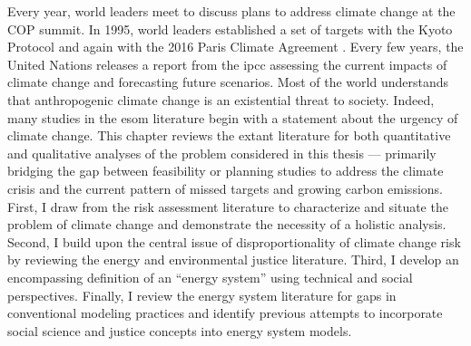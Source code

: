 Every year, world leaders meet to discuss plans to address climate change at the
COP summit. In 1995, world leaders established a set of targets with the Kyoto
Protocol \cite{united_nations_kyoto_1998} and again with the 2016 Paris Climate
Agreement \cite{united_nations_paris_2015}. Every few years, the United Nations
releases a report from the \ac{ipcc} assessing the current impacts of climate
change and forecasting future scenarios. Most of the world understands that
anthropogenic climate change is an existential threat to society. Indeed, many
studies in the \ac{esom} literature begin with a statement about the urgency of
climate change. This chapter reviews the extant literature for both quantitative
and qualitative analyses of the problem considered in this thesis --- primarily
bridging the gap between feasibility or planning studies to address the climate
crisis and the current pattern of missed targets and growing carbon emissions.
First, I draw from the risk assessment literature to characterize and situate
the problem of climate change and demonstrate the necessity of a holistic
analysis. Second, I build upon the central issue of disproportionality of
climate change risk by reviewing the energy and environmental justice
literature. Third, I develop an encompassing definition of an ``energy system''
using technical and social perspectives. Finally, I review the energy system
literature for gaps in conventional modeling practices and identify previous
attempts to incorporate social science and justice concepts into energy system
models.



%  
% 
% 




